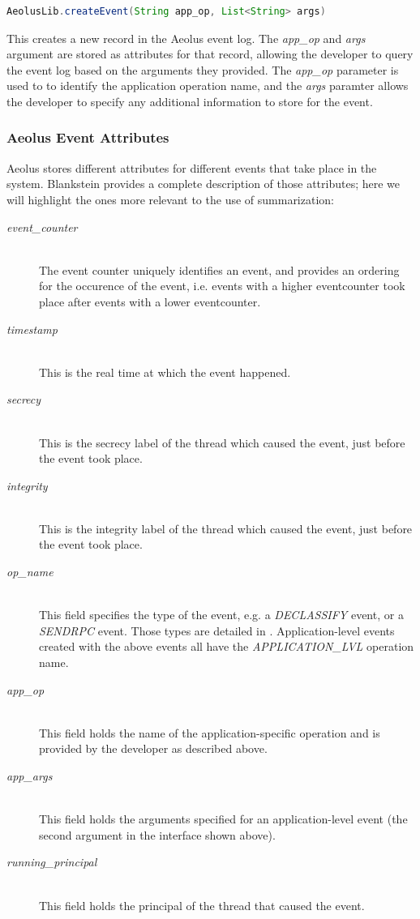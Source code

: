 \begin{lstlisting}[language=Java, label=app-logging]
AeolusLib.createEvent(String app_op, List<String> args)
\end{lstlisting}

\noindent
This creates a new record in the Aeolus event log. The \emph{app\_op} and \emph{args} argument are stored as attributes for that record, allowing the developer to query the event log based on the arguments they provided. The \emph{app\_op} parameter is used to to identify the application operation name, and the \emph{args} paramter allows the developer to specify any additional information to store for the event.

\subsubsection{Aeolus Event Attributes}
\label{sec:aeolus-event-attributes}
Aeolus stores different attributes for different events that take place in the system. Blankstein \cite{blanks} provides a complete description of those attributes; here we will highlight the ones more relevant to the use of summarization:

\begin{description}
  \item[\emph{event\_counter}] \ \\
    The event counter uniquely identifies an event, and provides an
    ordering for the occurence of the event, i.e. events with a higher 
    eventcounter took place after events with a lower eventcounter.
  \item[\emph{timestamp}] \ \\
    This is the real time at which the event happened.
  \item[\emph{secrecy}] \ \\
    This is the secrecy label of the thread which caused the event, 
    just before the event took place.
  \item[\emph{integrity}] \ \\
    This is the integrity label of the thread which caused the event, 
    just before the event took place.
  \item[\emph{op\_name}] \ \\
    This field specifies the type of the event, 
    e.g. a \emph{DECLASSIFY} event, 
    or a \emph{SENDRPC} event. Those types are 
    detailed in \cite{blanks}.
    Application-level events created with the above events
    all have the \emph{APPLICATION\_LVL} operation name.
  \item[\emph{app\_op}] \ \\
    This field holds the name of the 
    application-specific operation and is 
    provided by the developer as described above.
  \item[\emph{app\_args}] \ \\
    This field holds the arguments specified for an application-level 
    event (the second argument in the interface shown above).
  \item[\emph{running\_principal}] \ \\
    This field holds the principal of the thread that caused the event.
\end{description}

